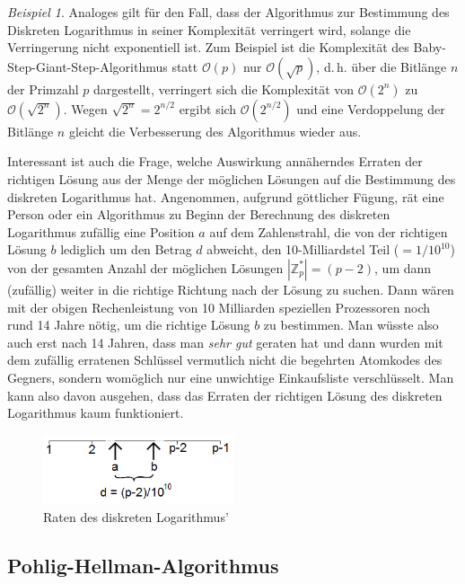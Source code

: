 \documentclass[
  a4paper,
  11pt,
]{scrartcl}
\theoremstyle{plain}
\theoremstyle{definition}
\theoremstyle{remark}
\newtheorem{beispiel}{Beispiel}
\newcommand{\Z}{\mathbb{Z}}
\begin{document}
\begin{beispiel}
  Analoges gilt für den Fall, dass der Algorithmus zur Bestimmung des Diskreten
  Logarithmus in seiner Komplexität verringert wird, solange die Verringerung
  nicht exponentiell ist. Zum Beispiel ist die Komplexität des
  Baby-Step-Giant-Step-Algorithmus statt $\mathcal{O}(p)$ nur
  $\mathcal{O}(\sqrt{p})$, d.\,h. über die Bitlänge $n$ der Primzahl $p$
  dargestellt, verringert sich die Komplexität von $\mathcal{O}(2^n)$ zu
  $\mathcal{O}(\sqrt{2^n})$. Wegen $\sqrt{2^n} = 2^{n/2}$ ergibt sich
  $\mathcal{O}(2^{n/2})$ und eine Verdoppelung der Bitlänge $n$ gleicht die
  Verbesserung des Algorithmus wieder aus.

  Interessant ist auch die Frage, welche Auswirkung annäherndes Erraten der
  richtigen Lösung aus der Menge der möglichen Lösungen auf die Bestimmung des
  diskreten Logarithmus hat. Angenommen, aufgrund göttlicher Fügung, rät eine
  Person oder ein Algorithmus zu Beginn der Berechnung des diskreten Logarithmus
  zufällig eine Position $a$ auf dem Zahlenstrahl, die von der richtigen Lösung
  $b$ lediglich um den Betrag $d$ abweicht, den 10-Milliardstel Teil ($=
  1/10^{10}$) von der gesamten Anzahl der möglichen Lösungen $\left| \Z_p^*
  \right| = (p-2)$, um dann (zufällig) weiter in die richtige Richtung nach der
  Lösung zu suchen. Dann wären mit der obigen Rechenleistung von 10 Milliarden
  speziellen Prozessoren noch rund 14 Jahre nötig, um die richtige Lösung $b$ zu
  bestimmen. Man wüsste also auch erst nach 14 Jahren, dass man \emph{sehr gut}
  geraten hat und dann wurden mit dem zufällig erratenen Schlüssel vermutlich
  nicht die begehrten Atomkodes des Gegners, sondern womöglich nur eine
  unwichtige Einkaufsliste verschlüsselt. Man kann also davon ausgehen, dass das
  Erraten der richtigen Lösung des diskreten Logarithmus kaum funktioniert.

  \begin{figure}[H]
    \centering
    \includegraphics[width=0.5\textwidth]{logRaten.png}
    \caption{Raten des diskreten Logarithmus’}
    \label{fig:logRaten}
  \end{figure}
\end{beispiel}

\subsection{Pohlig-Hellman-Algorithmus}
\label{sub:pohlig_hellman_algorithmus}
\end{document}
